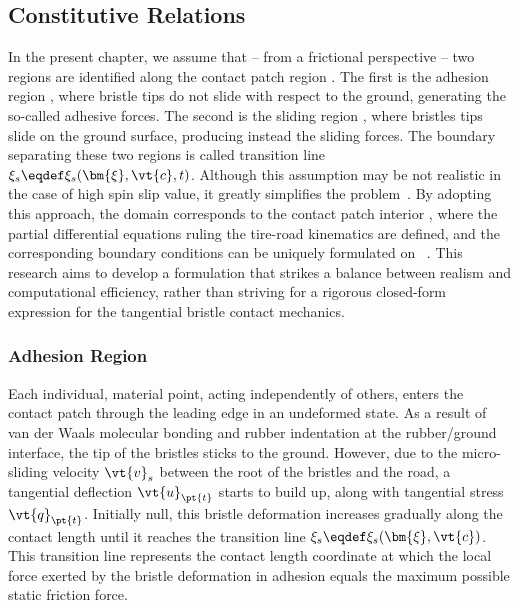 
\subsection{Constitutive Relations}
\label{app3:sec:constitutive_relations}

In the present chapter, we assume that -- from a frictional perspective -- two regions are identified along the contact patch region \cp{}. The first is the adhesion region \adh{}, where bristle tips do not slide with respect to the ground, generating the so-called adhesive forces. The second is the sliding region \sli{}, where bristles tips slide on the ground surface, producing instead the sliding forces. The boundary separating these two regions is called transition line $\xi_s \eqdef \xi_s(\bm{\xi},\vt{c},t)$. Although this assumption may be not realistic in the case of high spin slip value, it greatly simplifies the problem~\cite{romano2022advanced}. By adopting this approach, the domain corresponds to the contact patch interior , where the partial differential equations ruling the tire-road kinematics are defined, and the corresponding boundary conditions can be uniquely formulated on ~\cite{romano2022analytical}. This research aims to develop a formulation that strikes a balance between realism and computational efficiency, rather than striving for a rigorous closed-form expression for the tangential bristle contact mechanics.

\subsubsection{Adhesion Region}

Each individual, material point, acting independently of others,  enters the contact patch through the leading edge in an undeformed state.  As a result of van der Waals molecular bonding
and rubber indentation
at the rubber/ground interface, the tip of the bristles sticks to the ground. However, due to the micro-sliding velocity $\vt{v}_s$ between the root of the bristles and the road, a tangential deflection $\vt{u}_{\pt{t}}$ starts to build up, along with tangential stress $\vt{q}_{\pt{t}}$. Initially null, this bristle deformation increases gradually along the contact length until it reaches the transition line $\xi_s \eqdef \xi_s(\bm{\xi},\vt{c})$. This transition line represents the contact length coordinate at which the local force exerted by the bristle deformation in adhesion equals the maximum possible static friction force.

